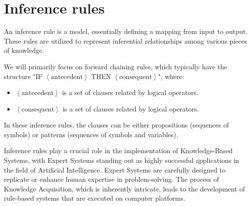 \section{Inference rules}

\begin{definition}
    An inference rule is a model, essentially defining a mapping from input to output. 
    These rules are utilized to represent inferential relationships among various pieces of knowledge.
\end{definition}
We will primarily focus on forward chaining rules, which typically have the structure "IF $\left\langle \text{antecedent} \right\rangle$ THEN $\left\langle \text{consequent} \right\rangle$", where: 
\begin{itemize}
    \item $\left\langle \text{antecedent} \right\rangle$ is a set of clauses related by logical operators.
    \item $\left\langle \text{consequent} \right\rangle$ is a set of clauses related by logical operators.
\end{itemize}
In these inference rules, the clauses can be either propositions (sequences of symbols) or patterns (sequences of symbols and variables).

Inference rules play a crucial role in the implementation of Knowledge-Based Systems, with Expert Systems standing out as highly successful applications in the field of Artificial Intelligence. 
Expert Systems are carefully designed to replicate or enhance human expertise in problem-solving. 
The process of Knowledge Acquisition, which is inherently intricate, leads to the development of rule-based systems that are executed on computer platforms.

